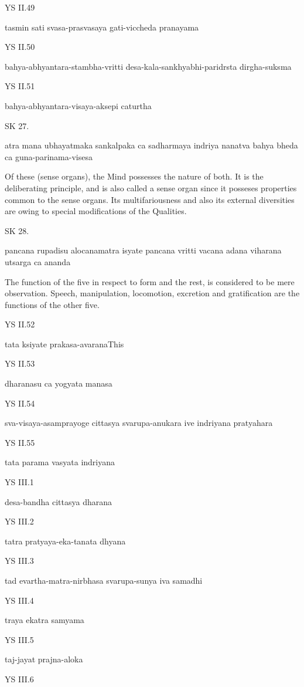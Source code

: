 YS II.49

    tasmin sati svasa-prasvasaya gati-viccheda pranayama

YS II.50

    bahya-abhyantara-stambha-vritti
    desa-kala-sankhyabhi-paridrsta dirgha-suksma

YS II.51

    bahya-abhyantara-visaya-aksepi caturtha

SK 27.

atra mana ubhayatmaka sankalpaka ca sadharmaya indriya
nanatva bahya bheda ca guna-parinama-visesa

Of these (sense organs), the Mind possesses the nature of both.
It is the deliberating principle, and is also called a sense organ
since it posseses properties common to the sense organs.
Its multifariousness and also its external diversities are owing
to special modifications of the Qualities.

SK 28.

pancana rupadisu alocanamatra isyate
pancana vritti vacana adana viharana utsarga ca ananda

The function of the five in respect to form and the rest,
is considered to be mere observation.
Speech, manipulation, locomotion, excretion and gratification
are the functions of the other five.

YS II.52

    tata ksiyate prakasa-avaranaThis 

YS II.53

    dharanasu ca yogyata manasa

YS II.54

    sva-visaya-asamprayoge cittasya svarupa-anukara ive indriyana pratyahara

YS II.55

    tata parama vasyata indriyana

YS III.1

    desa-bandha cittasya dharana

YS III.2

    tatra pratyaya-eka-tanata dhyana

YS III.3

    tad evartha-matra-nirbhasa svarupa-sunya iva samadhi

YS III.4

    traya ekatra samyama

YS III.5

    taj-jayat prajna-aloka

YS III.6


